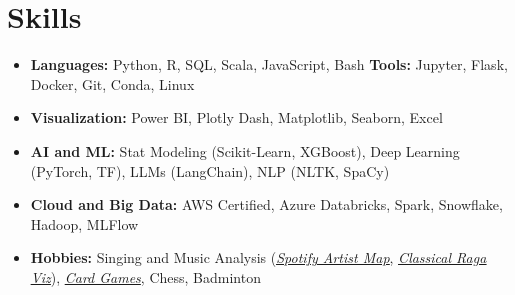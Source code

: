 \documentclass[letterpaper,11pt]{article}
\newcommand{\resumeItem}[1]{
  \item{\small{#1}}
  \vspace{-1.5px}
}
\newcommand{\resumeItemListStart}{
  \begin{itemize}[leftmargin=0.18in, label=\textbullet]
}
\newcommand{\resumeItemListEnd}{\end{itemize}}
\begin{document}
\section{\large{Skills}}
\vspace{3pt}
\begin{itemize}[leftmargin=0.00in, label={}, itemsep=0pt, parsep=0pt]
\item{
\small{\textbf{Languages:} Python, R, SQL, Scala, JavaScript, Bash}
\hspace{1cm}
\small{\textbf{Tools:} Jupyter, Flask, Docker, Git, Conda, Linux}
}
\item{
\small{\textbf{Visualization:} Power BI, Plotly Dash, Matplotlib, Seaborn, Excel}
}
\item{
\small{\textbf{AI and ML:} Stat Modeling (Scikit-Learn, XGBoost), Deep Learning (PyTorch, TF), LLMs (LangChain), NLP (NLTK, SpaCy)}
}



\item{
\small{\textbf{Cloud and Big Data:} AWS Certified, Azure Databricks, Spark, Snowflake, Hadoop, MLFlow}
}

\item{
\small{\textbf{Hobbies:} Singing and Music Analysis (\underline{\href{https://vishugp.github.io/MusicMandala/}{\textit{Spotify Artist Map}}}, \underline{\href{https://carnatic.vishguru.com}{\textit{Classical Raga Viz}}}),  
\href{https://vishugp.github.io/Thuruppu/}{\textit{Card Games}}, Chess, Badminton}
}

\end{itemize}









\end{document}
